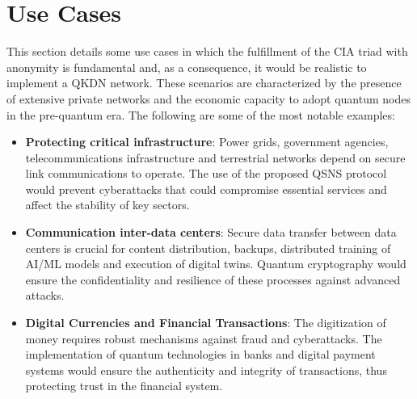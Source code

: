 \documentclass[conference]{IEEEtran}
\begin{document}
\section{Use Cases \label{sec:uoc}}

\begin{comment}
  \textcolor{red}{mveiga: I would suggest as use cases the following ones: (i) protection of critical infrastructures (e.g., power grids, government entities, core of telco networks, protection on non-terrestrial networks); (ii) inter-data-center communications (i.e., massive content distribution, backups of sensitive data, distributed training and inference of large AI/ML models, interconnection of data lakes, distributed execution of digital twins, etc.); (iii) digital currencies and financial transactions (not necessarily criptocurrencies, just purely digital money).}  
\end{comment}

This section details some use cases in which the fulfillment of the CIA triad with anonymity is fundamental and, as a consequence, it would be realistic to implement a QKDN network. These scenarios are characterized by the presence of extensive private networks and the economic capacity to adopt quantum nodes in the pre-quantum era. The following are some of the most notable examples:

\begin{itemize}
    \item \textbf{Protecting critical infrastructure}: Power grids, government agencies, telecommunications infrastructure and terrestrial networks depend on secure link communications to operate. The use of the proposed QSNS protocol would prevent cyberattacks that could compromise essential services and affect the stability of key sectors.

    \item \textbf{Communication inter-data centers}: Secure data transfer between data centers is crucial for content distribution, backups, distributed training of AI/ML models and execution of digital twins. Quantum cryptography would ensure the confidentiality and resilience of these processes against advanced attacks.

    \item \textbf{Digital Currencies and Financial Transactions}: The digitization of money requires robust mechanisms against fraud and cyberattacks. The implementation of quantum technologies in banks and digital payment systems would ensure the authenticity and integrity of transactions, thus protecting trust in the financial system.
\end{itemize}
\end{document}
